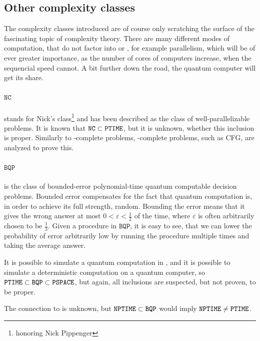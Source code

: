 \subsection{Other complexity classes}
The complexity classes introduced are of course only scratching the surface 
of the fascinating topic of complexity theory. There are many different modes 
of computation, that do not factor into \PTIME or \NPTIME, for example 
parallelism, which will be of ever greater importance, as the number of cores 
of computers increase, when the sequencial speed cannot. A bit further down 
the road, the quantum computer will get its share.

\paragraph{$\mathtt{NC}$}
stands for Nick's class\footnote{honoring Nick Pippenger} and
has been described as the class of well-parallelizable 
problems\citationneeded. It is known that $\mathtt{NC} \subset \mathtt{PTIME}$, but it is unknown, 
whether this inclusion is proper. Similarly to \NPTIME-complete problems, 
\PTIME-complete problems, such as CFG, are analyzed to prove this. 

\paragraph{$\mathtt{BQP}$}
is the class of bounded-error polynomial-time quantum computable decision 
problems. Bounded error compensates for the fact that quantum computation is, 
in order to achieve its full strength, random. Bounding the error means that 
it gives the wrong answer at most $0<\varepsilon<\frac{1}{2}$ of the time, where 
$\varepsilon$ is often arbitrarily chosen to be $\frac{1}{3}$. Given a 
procedure in $\mathtt{BQP}$, it is easy to see, that we can lower the 
probability of error arbitrarily low by running the procedure multiple times 
and taking the average answer.

It is possible to simulate a quantum computation in \PSPACE, and it is 
possible to simulate a deterministic computation on a quantum computer, so 
$\mathtt{PTIME} \subset \mathtt{BQP} \subset \mathtt{PSPACE}$, but again, all inclusions are 
suspected, but not proven, to be proper.

The connection to \NPTIME is unknown, but $\mathtt{NPTIME}\subset \mathtt{BQP}$ would 
imply $\mathtt{NPTIME}\neq \mathtt{PTIME}$.